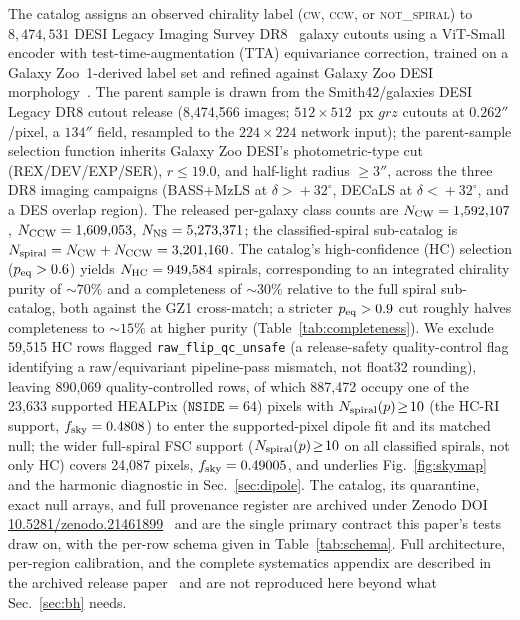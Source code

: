 \documentclass[twocolumn,linenumbers]{aastex702}
\newcommand{\CW}{\textsc{cw}}
\newcommand{\CCW}{\textsc{ccw}}
\newcommand{\NS}{\textsc{not\_spiral}}
\newcommand{\nside}{\texttt{NSIDE}}
\newcommand{\HCRI}{\textsc{HC-RI}}
\newcommand{\FSC}{\textsc{FSC}}
\begin{document}
The catalog assigns an observed chirality label (\CW, \CCW, or \NS) to
$8{,}474{,}531$ DESI Legacy Imaging Survey DR8~\cite{Dey:2019} galaxy cutouts
using a ViT-Small encoder with test-time-augmentation (TTA) equivariance
correction, trained on a Galaxy Zoo~1-derived label set and refined against
Galaxy Zoo DESI morphology~\cite{Walmsley:2023}. The parent sample is drawn
from the Smith42/galaxies DESI Legacy DR8 cutout release (8,474,566 images;
$512\times512$~px $grz$ cutouts at $0.262''$/pixel, a $134''$ field, resampled
to the $224\times224$ network input); the parent-sample
selection function inherits Galaxy Zoo DESI's photometric-type cut
(REX/DEV/EXP/SER), $r\!\leq\!19.0$, and half-light radius $\geq\!3''$, across
the three DR8 imaging campaigns (BASS+MzLS at $\delta\!>\!+32^\circ$,
DECaLS at $\delta\!<\!+32^\circ$, and a DES overlap region). The released
per-galaxy class counts are $N_{\rm CW}=1{,}592{,}107$, $N_{\rm
CCW}=1{,}609{,}053$, $N_{\rm NS}=5{,}273{,}371$; the classified-spiral
sub-catalog is $N_{\rm spiral}=N_{\rm CW}+N_{\rm CCW}=3{,}201{,}160$. The
catalog's high-confidence (HC) selection ($p_{\rm eq}>0.6$) yields
$N_{\rm HC}=949{,}584$ spirals, corresponding to an integrated chirality
purity of $\sim\!70\%$ and a completeness of $\sim\!30\%$ relative to the
full spiral sub-catalog, both against the GZ1 cross-match; a stricter
$p_{\rm eq}>0.9$ cut roughly halves completeness to $\sim\!15\%$ at higher
purity (Table~\ref{tab:completeness}). We exclude 59,515 HC rows flagged
\texttt{raw\_flip\_qc\_unsafe} (a
release-safety quality-control flag identifying a raw/equivariant
pipeline-pass mismatch, not float32 rounding), leaving 890,069
quality-controlled rows, of which 887,472 occupy one of the 23,633
supported HEALPix ($\nside=64$) pixels with $N_{\rm spiral}(p)\!\geq\!10$
(the \HCRI{} support, $f_{\rm sky}=0.4808$) to enter the
supported-pixel dipole fit and its matched null; the wider full-spiral
\FSC{} support ($N_{\rm spiral}(p)\!\geq\!10$ on all classified spirals, not
only HC) covers 24,087 pixels, $f_{\rm sky}=0.49005$, and underlies
Fig.~\ref{fig:skymap} and the harmonic diagnostic in
Sec.~\ref{sec:dipole}. The catalog, its quarantine, exact null arrays, and
full provenance register are archived under Zenodo DOI
\href{https://doi.org/10.5281/zenodo.21461899}{10.5281/zenodo.21461899}~\cite{Golden:P4Zenodo}
and are the single primary contract this paper's tests draw on, with the
per-row schema given in Table~\ref{tab:schema}. Full architecture,
per-region calibration, and the complete systematics appendix are
described in the archived release paper~\cite{Golden:P4v274} and are not
reproduced here beyond what Sec.~\ref{sec:bh} needs.
\end{document}
